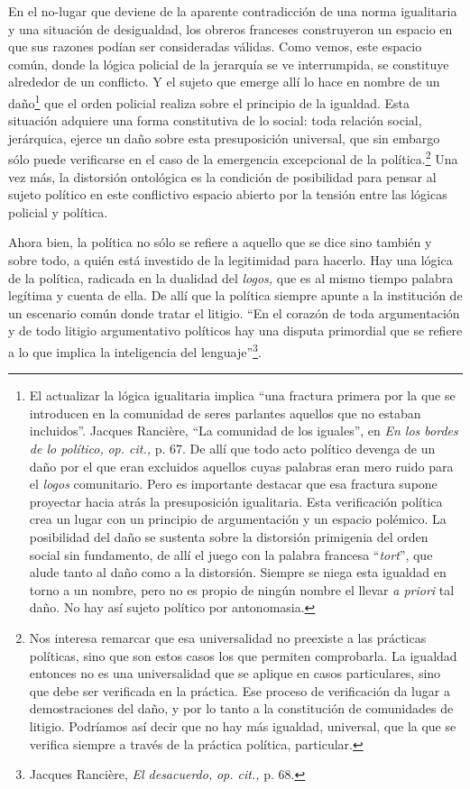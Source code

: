 En el no-lugar que deviene de la aparente contradicción de una norma igualitaria y una situación de desigualdad, los obreros franceses construyeron un espacio en que sus razones podían ser consideradas válidas. Como vemos, este espacio común, donde la lógica policial de la jerarquía se ve interrumpida, se constituye alrededor de un conflicto. Y el sujeto que emerge allí lo hace en nombre de un daño\footnote{El actualizar la lógica igualitaria implica \enquote{una fractura primera por la que se introducen en la comunidad de seres parlantes aquellos que no estaban incluidos}. Jacques Rancière, \enquote{La comunidad de los iguales}, en \emph{En los bordes de lo político,} \emph{op. cit.,} p. 67. De allí que todo acto político devenga de un daño por el que eran excluidos aquellos cuyas palabras eran mero ruido para el \emph{logos} comunitario. Pero es importante destacar que esa fractura supone proyectar hacia atrás la presuposición igualitaria. Esta verificación política crea un lugar con un principio de argumentación y un espacio polémico. La posibilidad del daño se sustenta sobre la distorsión primigenia del orden social sin fundamento, de allí el juego con la palabra francesa \enquote{\emph{tort}}, que alude tanto al daño como a la distorsión. Siempre se niega esta igualdad en torno a un nombre, pero no es propio de ningún nombre el llevar \emph{a priori} tal daño. No hay así sujeto político por antonomasia.} que el orden policial realiza sobre el principio de la igualdad. Esta situación adquiere una forma constitutiva de lo social: toda relación social, jerárquica, ejerce un daño sobre esta presuposición universal, que sin embargo sólo puede verificarse en el caso  de la emergencia excepcional de la política.\footnote{Nos interesa remarcar que esa universalidad no preexiste a las prácticas políticas, sino que son estos casos los que permiten comprobarla. La igualdad entonces no es una universalidad que se aplique en casos particulares, sino que debe ser verificada en la práctica. Ese proceso de verificación da lugar a demostraciones del daño, y por lo tanto a la constitución de comunidades de litigio. Podríamos así decir que no hay más igualdad, universal, que la que se verifica siempre a través de la práctica política, particular.} Una vez más, la distorsión ontológica es la condición de posibilidad para pensar al sujeto político en este conflictivo espacio abierto por la tensión entre las lógicas policial y política.

Ahora bien, la política no sólo se refiere a aquello que se dice sino también y sobre todo, a quién está investido de la legitimidad para hacerlo. Hay una lógica de la política, radicada en la dualidad del \emph{logos,} que es al mismo tiempo palabra legítima y cuenta de ella. De allí que la política siempre apunte a la institución de un escenario común donde tratar el litigio. \enquote{En el corazón de toda argumentación y de todo litigio argumentativo políticos hay una disputa primordial que se refiere a lo que implica la inteligencia del lenguaje}\footnote{Jacques Rancière, \emph{El desacuerdo,} \emph{op. cit.,} p. 68.}.

